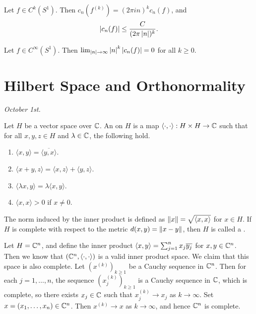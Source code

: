 \begin{corollary}
    Let $f \in C^{k}(S^{1})$. Then $c_{n}(f^{(k)}) = (2\pi i n)^{k}c_{n}(f)$, and
    \begin{align}
        \left| c_{n}(f) \right| \leq \frac{C}{(2\pi\left| n \right|)^{k}}.
    \end{align}
\end{corollary}
\begin{corollary}
    Let $f \in C^{\infty}(S^{1})$. Then $\lim_{\left| n \right| \to \infty} \left| n \right|^{k}\left| c_{n}(f) \right| = 0$ for all $k \geq 0$.
\end{corollary}

\section{Hilbert Space and Orthonormality}
\textit{October 1st.}

\begin{definition}
    Let $H$ be a vector space over $\mathbb{C}$. An  on $H$ is a map $\langle \cdot, \cdot \rangle : H \times H \to \mathbb{C}$ such that for all $x,y,z \in H$ and $\lambda \in \mathbb{C}$, the following hold.
    \begin{enumerate}
        \item $\langle x,y\rangle = \overline{\langle y,x\rangle}$.
        \item $\langle x+y,z\rangle = \langle x,z\rangle + \langle y,z\rangle$.
        \item $\langle \lambda x,y\rangle = \lambda\langle x,y\rangle$.
        \item $\langle x,x\rangle > 0$ if $x \neq 0$.
    \end{enumerate}
    The norm induced by the inner product is defined as $\left\lVert x\right\rVert = \sqrt{\langle x,x\rangle}$ for $x \in H$. If $H$ is complete with respect to the metric $d(x,y) = \left\lVert x-y\right\rVert$, then $H$ is called a .
\end{definition}


\begin{example}
    Let $H = \mathbb{C}^{n}$, and define the inner product $\langle x,y\rangle = \sum_{j=1}^{n} x_{j}\overline{y_{j}}$ for $x,y \in \mathbb{C}^{n}$. Then we know that $(\mathbb{C}^{n},\langle \cdot, \cdot \rangle)$ is a valid inner product space. We claim that this space is also complete. Let $(x^{(k)})_{k \geq 1}$ be a Cauchy sequence in $\mathbb{C}^{n}$. Then for each $j = 1,\ldots,n$, the sequence $(x_{j}^{(k)})_{k \geq 1}$ is a Cauchy sequence in $\mathbb{C}$, which is complete, so there exists $x_{j} \in \mathbb{C}$ such that $x_{j}^{(k)} \to x_{j}$ as $k \to \infty$. Set $x = (x_{1},\ldots,x_{n}) \in \mathbb{C}^{n}$. Then $x^{(k)} \to x$ as $k \to \infty$, and hence $\mathbb{C}^{n}$ is complete.
\end{example}

